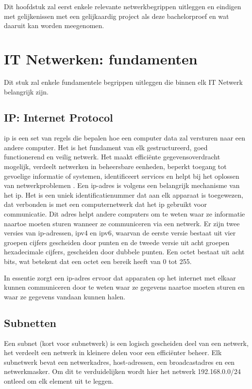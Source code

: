 Dit hoofdstuk zal eerst enkele relevante netwerkbegrippen uitleggen en eindigen met gelijkenissen met een gelijkaardig project als deze bachelorproef en wat daaruit kan worden meegenomen.


\section{IT Netwerken: fundamenten}
Dit stuk zal enkele fundamentele begrippen uitleggen die binnen elk IT Netwerk belangrijk zijn.

\subsection{IP: Internet Protocol}
\acrfull{ip} is een set van regels die bepalen hoe een computer data zal versturen naar een andere computer. Het is het fundament van elk gestructureerd, goed functionerend en veilig netwerk. Het maakt efficiënte gegevensoverdracht mogelijk, verdeelt netwerken in beheersbare eenheden, beperkt toegang tot gevoelige informatie of systemen, identificeert services en helpt bij het oplossen van netwerkproblemen \autocite{Postel1981}. Een \acrshort{ip}-adres is volgens \textcite{Postel1981} een belangrijk mechanisme van het \acrshort{ip}. Het is een uniek identificatienummer dat aan elk apparaat is toegewezen, dat verbonden is met een computernetwerk dat het \acrshort{ip} gebruikt voor communicatie. Dit adres helpt andere computers om te weten waar ze informatie naartoe moeten sturen wanneer ze communiceren via een netwerk.
Er zijn twee versies van \acrshort{ip}-adressen, \acrshort{ip}v4 en \acrshort{ip}v6, waarvan de eerste versie bestaat uit vier groepen cijfers gescheiden door punten en de tweede versie uit acht groepen hexadecimale cijfers, gescheiden door dubbele punten. Een octet bestaat uit acht bits, wat betekent dat een octet een bereik heeft van 0 tot 255.

In essentie zorgt een \acrshort{ip}-adres ervoor dat apparaten op het internet met elkaar kunnen communiceren door te weten waar ze gegevens naartoe moeten sturen en waar ze gegevens vandaan kunnen halen.


\subsection{Subnetten}
Een subnet (kort voor subnetwerk) is een logisch gescheiden deel van een netwerk, het verdeelt een netwerk in kleinere delen voor een efficiënter beheer. Elk subnetwerk bevat een netwerkadres, host-adressen, een broadcastadres en een netwerkmasker. Om dit te verduidelijken wordt hier het netwerk 192.168.0.0/24 ontleed om elk element uit te leggen.

